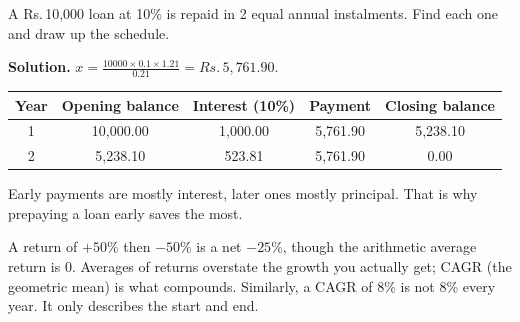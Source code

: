 \documentclass[11pt,a4paper,openany]{report}
\newcommand{\Rs}{Rs.\,}
\begin{document}
\begin{example}
A \Rs10,000 loan at 10\% is repaid in 2 equal annual instalments. Find each one and draw up the schedule.

\textbf{Solution.} $x=\frac{10000\times0.1\times1.21}{0.21}=\Rs5,761.90$.
\begin{center}\small
\begin{tabular}{ccccc}
\toprule
Year & Opening balance & Interest (10\%) & Payment & Closing balance\\\midrule
1 & 10,000.00 & 1,000.00 & 5,761.90 & 5,238.10\\
2 & 5,238.10 & 523.81 & 5,761.90 & 0.00\\
\bottomrule
\end{tabular}
\end{center}
Early payments are mostly interest, later ones mostly principal. That is why prepaying a loan early saves the most.
\end{example}

\begin{trap}
A return of $+50\%$ then $-50\%$ is a net $-25\%$, though the arithmetic average return is 0. Averages of returns overstate the growth you actually get; CAGR (the geometric mean) is what compounds. Similarly, a CAGR of 8\% is not 8\% every year. It only describes the start and end.
\end{trap}
\end{document}
